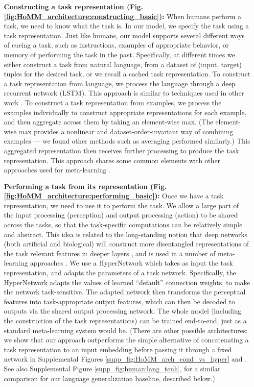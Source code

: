 \textbf{Constructing a task representation (Fig. \ref{fig:HoMM_architecture:constructing_basic}):} When humans perform a task, we need to know what the task is. In our model, we specify the task using a task representation. Just like humans, our model supports several different ways of cueing a task, such as instructions, examples of appropriate behavior, or memory of performing the task in the past. Specifically, at different times we either construct a task from natural language, from a dataset of (input, target) tuples for the desired task, or we recall a cached task representation. To construct a task representation from language, we process the language through a deep recurrent network (LSTM). This approach is similar to techniques used in other work \citep[e.g.]{Hermann2017,Oh2017a,Hill2019a}. To construct a task representation from examples, we process the examples individually to construct appropriate representations for each example, and then aggregate across them by taking an element-wise max. (The element-wise max provides a nonlinear and dataset-order-invariant way of combining examples --- we found other methods such as averaging performed similarly.) This aggregated representation then receives further processing to produce the task representation. This approach shares some common elements with other approaches used for meta-learning \citep{Garnelo2018}. 

\textbf{Performing a task from its representation (Fig. \ref{fig:HoMM_architecture:performing_basic}):} Once we have a task representation, we need to use it to perform the task. We allow a large part of the input processing (perception) and output processing (action) to be shared across the tasks, so that the task-specific computations can be relatively simple and abstract. This idea is related to the long-standing notion that deep networks (both artificial and biological) will construct more disentangled representations of the task relevant features in deeper layers \citep{Dicarlo2007, Erhan2010}, and is used in a number of meta-learning approaches \citep[e.g.]{Vinyals2016}. We use a HyperNetwork \citep{Ha2016} which takes as input the task representation, and adapts the parameters of a task network. Specifically, the HyperNetwork adapts the values of learned ``default'' connection weights, to make the network task-sensitive. The adapted network then transforms the perceptual features into task-appropriate output features, which can then be decoded to outputs via the shared output processing network. The whole model (including the construction of the task representations) can be trained end-to-end, just as a standard meta-learning system would be. (There are other possible architectures; we show that our approach outperforms the simple alternative of concatenating a task representation to an input embedding before passing it through a fixed network in Supplemental Figures \ref{supp_fig:HoMM_arch_cond_vs_hyper} and \label{supp_fig:extending:RL:arch_cond_vs_hyper}. See also Supplemental Figure \ref{supp_fig:human:lang_tcnh}, for a similar comparison for our language generalization baseline, described below.) 


